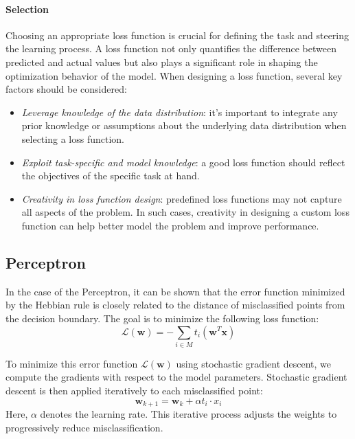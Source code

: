\paragraph*{Selection}
Choosing an appropriate loss function is crucial for defining the task and steering the learning process.
A loss function not only quantifies the difference between predicted and actual values but also plays a significant role in shaping the optimization behavior of the model.
When designing a loss function, several key factors should be considered:
\begin{itemize}
    \item \textit{Leverage knowledge of the data distribution}: it's important to integrate any prior knowledge or assumptions about the underlying data distribution when selecting a loss function. 
    \item \textit{Exploit task-specific and model knowledge}: a  good loss function should reflect the objectives of the specific task at hand.
    \item \textit{Creativity in loss function design}: predefined loss functions may not capture all aspects of the problem. 
        In such cases, creativity in designing a custom loss function can help better model the problem and improve performance.
\end{itemize}

\subsection{Perceptron}
In the case of the Perceptron, it can be shown that the error function minimized by the Hebbian rule is closely related to the distance of misclassified points from the decision boundary. 
The goal is to minimize the following loss function:
\[\mathcal{L}(\mathbf{w}) = -\sum_{i \in M} t_i (\mathbf{w}^T\mathbf{x})\]

To minimize this error function $\mathcal{L}(\mathbf{w})$ using stochastic gradient descent, we compute the gradients with respect to the model parameters. 
Stochastic gradient descent is then applied iteratively to each misclassified point:
\[\mathbf{w}_{k+1} = \mathbf{w}_k + \alpha t_i \cdot x_i \]
Here, $\alpha$ denotes the learning rate.
This iterative process adjusts the weights to progressively reduce misclassification.